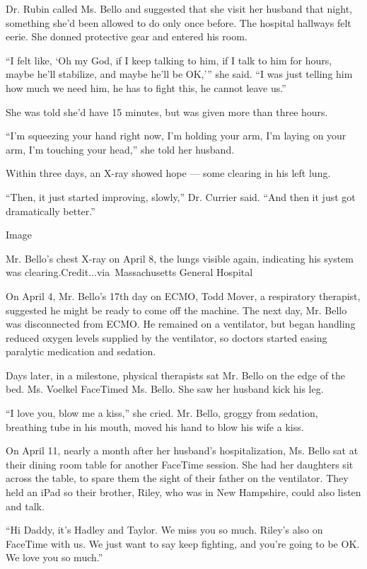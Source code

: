 Dr. Rubin called Ms. Bello and suggested that she visit her husband that
night, something she'd been allowed to do only once before. The hospital
hallways felt eerie. She donned protective gear and entered his room.

``I felt like, `Oh my God, if I keep talking to him, if I talk to him
for hours, maybe he'll stabilize, and maybe he'll be OK,''' she said.
``I was just telling him how much we need him, he has to fight this, he
cannot leave us.''

She was told she'd have 15 minutes, but was given more than three hours.

``I'm squeezing your hand right now, I'm holding your arm, I'm laying on
your arm, I'm touching your head,'' she told her husband.

Within three days, an X-ray showed hope --- some clearing in his left
lung.

``Then, it just started improving, slowly,'' Dr. Currier said. ``And
then it just got dramatically better.''

Image

Mr. Bello's chest X-ray on April 8, the lungs visible again, indicating
his system was clearing.Credit...via~Massachusetts General Hospital

On April 4, Mr. Bello's 17th day on ECMO, Todd Mover, a respiratory
therapist, suggested he might be ready to come off the machine. The next
day, Mr. Bello was disconnected from ECMO. He remained on a ventilator,
but began handling reduced oxygen levels supplied by the ventilator, so
doctors started easing paralytic medication and sedation.

Days later, in a milestone, physical therapists sat Mr. Bello on the
edge of the bed. Ms. Voelkel FaceTimed Ms. Bello. She saw her husband
kick his leg.

``I love you, blow me a kiss,'' she cried. Mr. Bello, groggy from
sedation, breathing tube in his mouth, moved his hand to blow his wife a
kiss.

On April 11, nearly a month after her husband's hospitalization, Ms.
Bello sat at their dining room table for another FaceTime session. She
had her daughters sit across the table, to spare them the sight of their
father on the ventilator. They held an iPad so their brother, Riley, who
was in New Hampshire, could also listen and talk.

``Hi Daddy, it's Hadley and Taylor. We miss you so much. Riley's also on
FaceTime with us. We just want to say keep fighting, and you're going to
be OK. We love you so much.''


